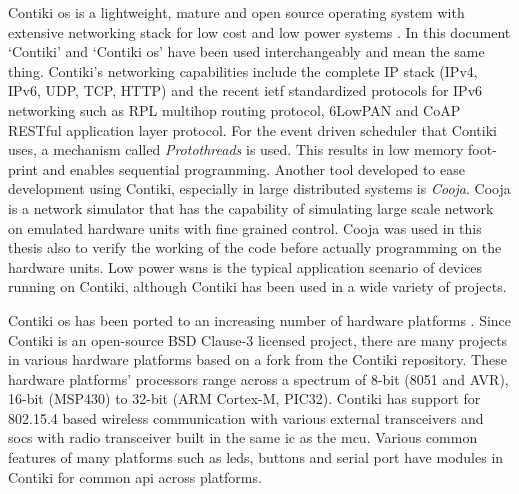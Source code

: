 Contiki \gls{os} is a lightweight, mature and open source operating system with extensive networking stack for low cost and low power systems \cite{Contiki}. In this document `Contiki' and `Contiki \gls{os}' have been used interchangeably and mean the same thing. Contiki's networking capabilities include the complete IP stack (IPv4, IPv6, UDP, TCP, HTTP) and the recent \gls{ietf} standardized protocols for IPv6 networking such as RPL multihop routing protocol, 6LowPAN and CoAP RESTful application layer protocol. For the event driven scheduler that Contiki uses, a mechanism called \emph{Protothreads} is used. This results in low memory foot-print and enables sequential programming. Another tool developed to ease development using Contiki, especially in large distributed systems is \emph{Cooja}. Cooja is a network simulator that has the capability of simulating large scale network on emulated hardware units with fine grained control. Cooja was used in this thesis also to verify the working of the code before actually programming on the hardware units. Low power \glspl{wsn} is the typical application scenario of devices running on Contiki, although Contiki has been used in a wide variety of projects.

Contiki \gls{os} has been ported to an increasing number of hardware platforms  \cite{contikiHw}. Since Contiki is an open-source BSD Clause-3 licensed project, there are many projects in various hardware platforms based on a fork from the Contiki repository. These hardware platforms' processors range across a spectrum of 8-bit (8051 and AVR), 16-bit (MSP430) to 32-bit (ARM Cortex-M, PIC32). Contiki has support for 802.15.4 based wireless communication with various external transceivers and \glspl{soc} with radio transceiver built in the same \gls{ic} as the \gls{mcu}. Various common features of many platforms such as \glspl{led}, buttons and serial port have modules in Contiki for common \gls{api} across platforms.


